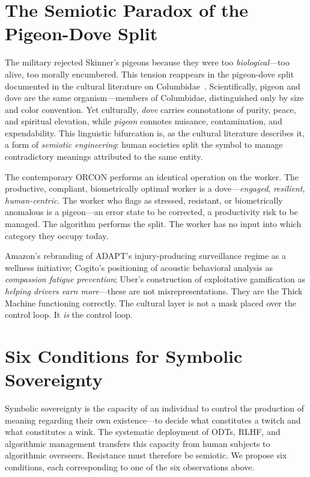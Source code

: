 \documentclass[runningheads]{llncs}
\begin{document}
\section{The Semiotic Paradox of the Pigeon-Dove Split}

The military rejected Skinner's pigeons because they were too
\emph{biological}---too alive, too morally encumbered. This tension reappears in
the pigeon-dove split documented in the cultural literature on
Columbidae~\cite{warpeace2025}. Scientifically, pigeon and dove are the same
organism---members of Columbidae, distinguished only by size and color
convention. Yet culturally, \emph{dove} carries connotations of purity, peace,
and spiritual elevation, while \emph{pigeon} connotes nuisance, contamination,
and expendability. This linguistic bifurcation is, as the cultural literature
describes it, a form of \emph{semiotic engineering}: human societies split the
symbol to manage contradictory meanings attributed to the same entity.

The contemporary ORCON performs an identical operation on the worker. The
productive, compliant, biometrically optimal worker is a dove---\emph{engaged},
\emph{resilient}, \emph{human-centric}. The worker who flags as stressed,
resistant, or biometrically anomalous is a pigeon---an error state to be
corrected, a productivity risk to be managed. The algorithm performs the split.
The worker has no input into which category they occupy today.

Amazon's rebranding of ADAPT's injury-producing surveillance regime as a
wellness initiative; Cogito's positioning of acoustic behavioral analysis as
\emph{compassion fatigue prevention}; Uber's construction of exploitative
gamification as \emph{helping drivers earn more}---these are not
misrepresentations. They are the Thick Machine functioning correctly. The
cultural layer is not a mask placed over the control loop. It \emph{is} the
control loop.

\section{Six Conditions for Symbolic Sovereignty}

Symbolic sovereignty is the capacity of an individual to control the production
of meaning regarding their own existence---to decide what constitutes a twitch
and what constitutes a wink. The systematic deployment of ODTs, RLHF, and
algorithmic management transfers this capacity from human subjects to algorithmic
overseers. Resistance must therefore be semiotic. We propose six conditions,
each corresponding to one of the six observations above.
\end{document}
